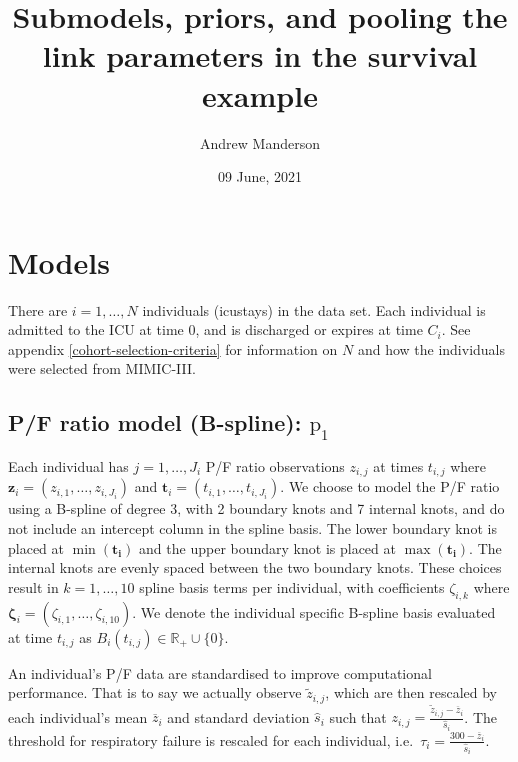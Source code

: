 \documentclass[
  10pt,
  a4paper,
]{article}
\title{Submodels, priors, and pooling the link parameters in the
survival example}
\author{Andrew Manderson}
\date{09 June, 2021}
\newcommand{\pd}{\text{p}}
\begin{document}
\maketitle

\hypertarget{models}{%
\section{Models}\label{models}}

There are \(i = 1, \ldots, N\) individuals (icustays) in the data set.
Each individual is admitted to the ICU at time \(0\), and is discharged
or expires at time \(C_{i}\). See appendix
\ref{cohort-selection-criteria} for information on \(N\) and how the
individuals were selected from MIMIC-III.

\hypertarget{pf-ratio-model-b-spline-pd_1}{%
\subsection{\texorpdfstring{P/F ratio model (B-spline):
\(\pd_{1}\)}{P/F ratio model (B-spline): \textbackslash pd\_\{1\}}}\label{pf-ratio-model-b-spline-pd_1}}

Each individual has \(j = 1, \ldots, J_{i}\) P/F ratio observations
\(z_{i, j}\) at times \(t_{i, j}\) where
\(\boldsymbol{z}_{i} = (z_{i, 1}, \ldots, z_{i, J_{i}})\) and
\(\boldsymbol{t}_{i} = (t_{i, 1}, \ldots, t_{i, J_{i}})\). We choose to
model the P/F ratio using a B-spline of degree 3, with 2 boundary knots
and 7 internal knots, and do not include an intercept column in the
spline basis. The lower boundary knot is placed at
\(\min(\boldsymbol{t_{i}})\) and the upper boundary knot is placed at
\(\max(\boldsymbol{t_{i}})\). The internal knots are evenly spaced
between the two boundary knots. These choices result in
\(k = 1, \ldots, 10\) spline basis terms per individual, with
coefficients \(\zeta_{i, k}\) where
\(\boldsymbol{\zeta}_{i} = (\zeta_{i, 1}, \ldots, \zeta_{i, 10})\). We
denote the individual specific B-spline basis evaluated at time
\(t_{i, j}\) as \(B_{i}(t_{i, j}) \in \mathbb{R}_{+} \cup \{0\}\).

An individual's P/F data are standardised to improve computational
performance. That is to say we actually observe \(\tilde{z}_{i, j}\),
which are then rescaled by each individual's mean \(\overline{z}_{i}\)
and standard deviation \(\hat{s}_{i}\) such that
\(z_{i, j} = \frac{\tilde{z}_{i, j} - \overline{z}_{i}}{\hat{s}_{i}}\).
The threshold for respiratory failure is rescaled for each individual,
i.e.~\(\tau_{i} = \frac{300 - \overline{z}_{i}}{\hat{s}_{i}}\).
\end{document}

